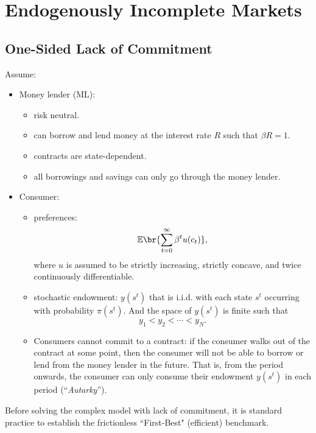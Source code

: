 \chapter{Endogenously Incomplete Markets}

\section{One-Sided Lack of Commitment}

Assume:
\begin{itemize}
    \item Money lender (ML):
    \begin{itemize}
        \item risk neutral.
        \item can borrow and lend money at the interest rate $R$ such that $\beta R = 1$.
        \item contracts are state-dependent.
        \item all borrowings and savings can only go through the money lender.
    \end{itemize}
    \item Consumer:
    \begin{itemize}
        \item preferences:
        \[
        \mathbb E\br{\sum_{t=0}^\infty \beta^t u(c_t)},
        \]
        where $u$ is assumed to be strictly increasing, strictly concave, and twice continuously differentiable.
        \item stochastic endowment: $y(s^t)$ that is i.i.d. with each state $s^t$ occurring with probability $\pi(s^t)$. And the space of $y(s^t)$ is finite such that
        \[
        y_1<y_2<\cdots<y_N.
        \]
        \item Consumers cannot commit to a contract: if the consumer walks out of the contract at some point, then the consumer will not be able to borrow or lend from the money lender in the future. That is, from the period onwards, the consumer can only consume their endowment $y(s^t)$ in each period (``\textit{Autarky}'').
    \end{itemize}
\end{itemize}

Before solving the complex model with lack of commitment, it is standard practice to establish the frictionless ``First-Best" (efficient) benchmark. 



